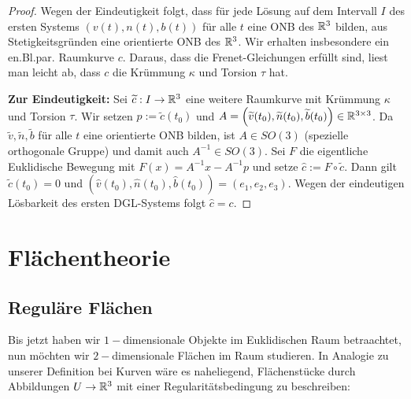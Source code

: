 \documentclass[11pt]{scrbook}
\newcommand{\kp}{\times} 	 		%
\begin{document}
\begin{st}
\begin{proof}
Wegen der Eindeutigkeit folgt, dass für jede Lösung auf dem Intervall $I$ des ersten Systems $\left( v(t), n(t), b(t) \right)$ für alle $t$ eine ONB des $\mathbb{R}^3$ bilden, aus Stetigkeitsgründen eine orientierte ONB des $\mathbb{R}^3$. Wir erhalten insbesondere ein en.Bl.par. Raumkurve $c$. Daraus, dass die Frenet-Gleichungen erfüllt sind, liest man leicht ab, dass $c$ die Krümmung $\kappa$ und Torsion $\tau$ hat.

\textbf{Zur Eindeutigkeit:} Sei $\widetilde c: I \to \mathbb{R}^3$ eine weitere Raumkurve mit Krümmung $\kappa$ und Torsion $\tau$. Wir setzen $p := \tilde c(t_0)$ und $A = \left( \tilde v(t_0), \tilde n(t_0), \tilde b(t_0) \right) \in \R^{3 \kp 3}$. Da $\tilde v, \tilde n, \tilde b$ für alle $t$ eine orientierte ONB bilden, ist $A \in SO(3)$ (spezielle orthogonale Gruppe) und damit auch $A^{-1} \in SO(3)$. Sei $F$ die eigentliche Euklidische Bewegung mit $F(x) = A^{-1} x - A^{-1} p$ und setze $\hat c := F \circ \tilde c$. Dann gilt $\tilde c(t_0) = 0$ und $\left(\hat  v(t_0), \hat n(t_0), \hat b(t_0) \right) = \left( e_1, e_2, e_3 \right)$. Wegen der eindeutigen Lösbarkeit des ersten DGL-Systems folgt $\hat c = c$.
\end{proof}
\end{st}

\chapter{Flächentheorie}

\section{Reguläre Flächen}

Bis jetzt haben wir $1-$dimensionale Objekte im Euklidischen Raum betraachtet, nun möchten wir $2-$dimensionale Flächen im Raum studieren. In Analogie zu unserer Definition bei Kurven wäre es naheliegend, Flächenstücke durch Abbildungen $U \to \mathbb{R}^3$ mit einer Regularitätsbedingung zu beschreiben:








\end{document}
